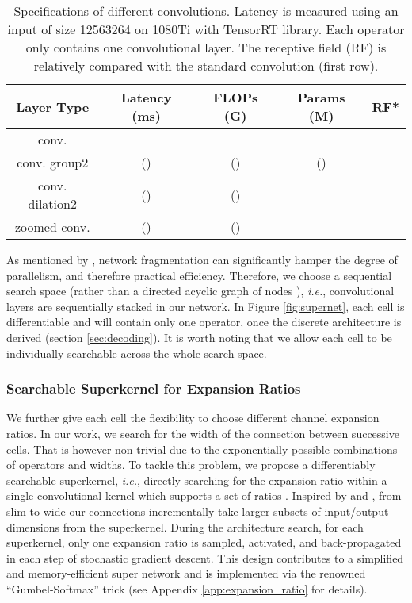 \documentclass{article} \usepackage{iclr2020_conference,times}
\begin{document}
\begin{wraptable}{r}{90mm}
\vspace{-1.5em}
\scriptsize
\begin{center}
\caption{Specifications of different convolutions. Latency is measured using an input of size 12563264 on 1080Ti with TensorRT library. Each operator only contains one convolutional layer. The receptive field (RF) is relatively compared with the standard convolution (first row).}
\begin{tabular}{ccccc}
\toprule
Layer Type & Latency (ms) & FLOPs (G) & Params (M) & RF* \\ \midrule
conv. &  &  &  &  \\
conv. group2 &  () &  () &  (\textcolor{red}{}) &  \\
conv. dilation2 &  (\textcolor{red}{}) &  () &  &  \\
zoomed conv. &  (\textcolor{green}{}) &  () &  &  \\ \bottomrule
\end{tabular}\label{table:ops}
\end{center}
\vspace{-1em}
\end{wraptable}

As mentioned by \citet{ma2018shufflenet}, network fragmentation can significantly hamper the degree of parallelism, and therefore practical efficiency. Therefore, we choose a sequential search space (rather than a directed acyclic graph of nodes \citep{liu2018darts}), \textit{i.e.}, convolutional layers are sequentially stacked in our network. In Figure \ref{fig:supernet}, each cell is differentiable \citep{liu2018darts,liu2019auto} and will contain only one operator, once the discrete architecture is derived (section \ref{sec:decoding}). It is worth noting that we allow each cell to be individually searchable across the whole search space.\vspace{-0.5em}


\subsubsection{Searchable Superkernel for Expansion Ratios}
We further give each cell the flexibility to choose different channel expansion ratios. In our work, we search for the width of the connection between successive cells.
That is however non-trivial due to the exponentially possible combinations of operators and widths.
To tackle this problem, we propose a differentiably searchable superkernel, \textit{i.e.}, directly searching for the expansion ratio  within a single convolutional kernel which supports a set of ratios . Inspired by \citep{yu2018slimmable} and \citep{stamoulis2019single}, from slim to wide our connections incrementally take larger subsets of input/output dimensions from the superkernel. During the architecture search, for each superkernel, only one expansion ratio is sampled, activated, and back-propagated in each step of stochastic gradient descent. This design contributes to a simplified and memory-efficient super network and is implemented via the renowned ``Gumbel-Softmax'' trick (see Appendix \ref{app:expansion_ratio} for details).
\end{document}
